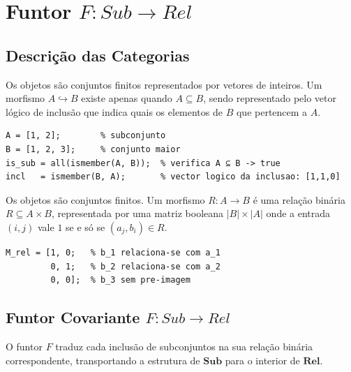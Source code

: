 \section{Funtor \texorpdfstring{$F: Sub \to Rel$}{F: Sub -> Rel}}
\label{sec:functor-sub-rel}

\subsection{Descrição das Categorias}

\begin{definition}
Os objetos são conjuntos finitos representados por vetores de inteiros. Um morfismo $A \hookrightarrow B$ existe apenas quando $A \subseteq B$, sendo representado pelo vetor lógico de inclusão que indica quais os elementos de $B$ que pertencem a $A$.
\end{definition}

\begin{lstlisting}[style=matlab, caption={Objeto e morfismo em $\mathbf{Sub}$}]
A = [1, 2];        % subconjunto
B = [1, 2, 3];     % conjunto maior
is_sub = all(ismember(A, B));  % verifica A ⊆ B -> true
incl   = ismember(B, A);       % vector logico da inclusao: [1,1,0]
\end{lstlisting}

\begin{definition}
Os objetos são conjuntos finitos. Um morfismo $R: A \to B$ é uma relação binária $R \subseteq A \times B$, representada por uma matriz booleana $|B| \times |A|$ onde a entrada $(i,j)$ vale $1$ se e só se $(a_j, b_i) \in R$.
\end{definition}

\begin{lstlisting}[style=matlab, caption={Objeto e morfismo em $\mathbf{Rel}$}]
% Relacao R ⊆ {1,2} x {1,2,3}: matriz booleana 3x2
M_rel = [1, 0;   % b_1 relaciona-se com a_1
         0, 1;   % b_2 relaciona-se com a_2
         0, 0];  % b_3 sem pre-imagem
\end{lstlisting}

\subsection{Funtor Covariante \texorpdfstring{$F: Sub \to Rel$}{F: Sub -> Rel}}

O funtor $F$ traduz cada inclusão de subconjuntos na sua relação binária correspondente, transportando a estrutura de $\mathbf{Sub}$ para o interior de $\mathbf{Rel}$.

